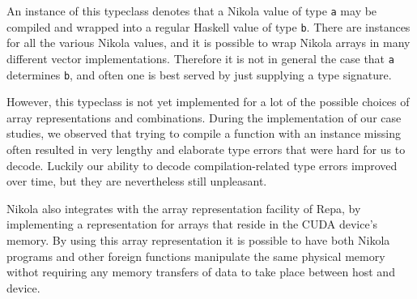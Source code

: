 An instance of this typeclass denotes that a Nikola value of type \lstinline{a}
may be compiled and wrapped into a regular Haskell value of type \lstinline{b}.
There are instances for all the various Nikola values, and it is possible to
wrap Nikola arrays in many different vector implementations. Therefore it is
not in general the case that \lstinline{a} determines \lstinline{b}, and often one is
best served by just supplying a type signature.

However, this typeclass is not yet implemented for a lot of the
possible choices of array representations and combinations. During the
implementation of our case studies, we observed that trying to compile
a function with an instance missing often resulted in very lengthy and
elaborate type errors that were hard for us to decode. Luckily our
ability to decode compilation-related type errors improved over time,
but they are nevertheless still unpleasant.

Nikola also integrates with the array representation facility of Repa, by
implementing a representation for arrays that reside in the CUDA device's
memory. By using this array representation it is possible to have both Nikola
programs and other foreign functions manipulate the same physical memory withot
requiring any memory transfers of data to take place between host and device.

